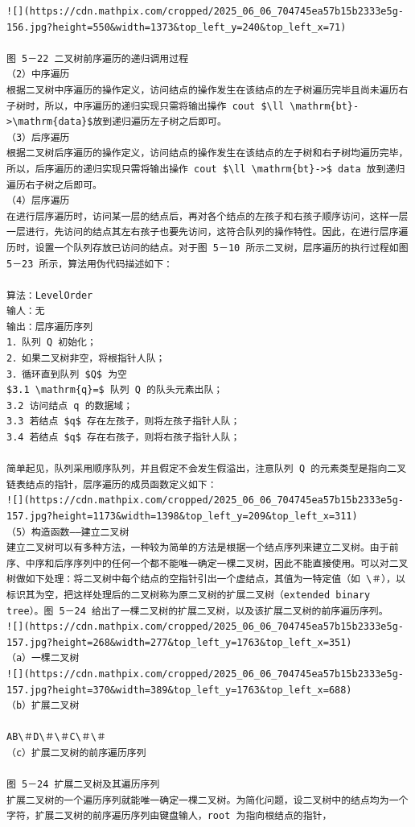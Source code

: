 \documentclass[10pt]{article}
\begin{document}
\begin{verbatim}
![](https://cdn.mathpix.com/cropped/2025_06_06_704745ea57b15b2333e5g-156.jpg?height=550&width=1373&top_left_y=240&top_left_x=71)

图 5－22 二叉树前序遍历的递归调用过程
（2）中序遍历
根据二叉树中序遍历的操作定义，访问结点的操作发生在该结点的左子树遍历完毕且尚未遍历右子树时，所以，中序遍历的递归实现只需将输出操作 cout $\ll \mathrm{bt}->\mathrm{data}$放到递归遍历左子树之后即可。
（3）后序遍历
根据二叉树后序遍历的操作定义，访问结点的操作发生在该结点的左子树和右子树均遍历完毕，所以，后序遍历的递归实现只需将输出操作 cout $\ll \mathrm{bt}->$ data 放到递归遍历右子树之后即可。
（4）层序遍历
在进行层序遍历时，访问某一层的结点后，再对各个结点的左孩子和右孩子顺序访问，这样一层一层进行，先访问的结点其左右孩子也要先访问，这符合队列的操作特性。因此，在进行层序遍历时，设置一个队列存放已访问的结点。对于图 5－10 所示二叉树，层序遍历的执行过程如图 5－23 所示，算法用伪代码描述如下：

算法：LevelOrder
输人：无
输出：层序遍历序列
1．队列 Q 初始化；
2．如果二叉树非空，将根指针人队；
3．循环直到队列 $Q$ 为空
$3.1 \mathrm{q}=$ 队列 Q 的队头元素出队；
3.2 访问结点 q 的数据域；
3.3 若结点 $q$ 存在左孩子，则将左孩子指针人队；
3.4 若结点 $q$ 存在右孩子，则将右孩子指针人队；

简单起见，队列采用顺序队列，并且假定不会发生假溢出，注意队列 Q 的元素类型是指向二叉链表结点的指针，层序遍历的成员函数定义如下：
![](https://cdn.mathpix.com/cropped/2025_06_06_704745ea57b15b2333e5g-157.jpg?height=1173&width=1398&top_left_y=209&top_left_x=311)
（5）构造函数——建立二叉树
建立二叉树可以有多种方法，一种较为简单的方法是根据一个结点序列来建立二叉树。由于前序、中序和后序序列中的任何一个都不能唯一确定一棵二叉树，因此不能直接使用。可以对二叉树做如下处理：将二叉树中每个结点的空指针引出一个虚结点，其值为一特定值（如 \＃），以标识其为空，把这样处理后的二叉树称为原二叉树的扩展二叉树（extended binary tree）。图 5－24 给出了一棵二叉树的扩展二叉树，以及该扩展二叉树的前序遍历序列。
![](https://cdn.mathpix.com/cropped/2025_06_06_704745ea57b15b2333e5g-157.jpg?height=268&width=277&top_left_y=1763&top_left_x=351)
（a）一棵二叉树
![](https://cdn.mathpix.com/cropped/2025_06_06_704745ea57b15b2333e5g-157.jpg?height=370&width=389&top_left_y=1763&top_left_x=688)
（b）扩展二叉树

AB\＃D\＃\＃C\＃\＃
（c）扩展二叉树的前序遍历序列

图 5－24 扩展二叉树及其遍历序列
扩展二叉树的一个遍历序列就能唯一确定一棵二叉树。为简化问题，设二叉树中的结点均为一个字符，扩展二叉树的前序遍历序列由键盘输人，root 为指向根结点的指针，


\end{verbatim}
\end{document}
